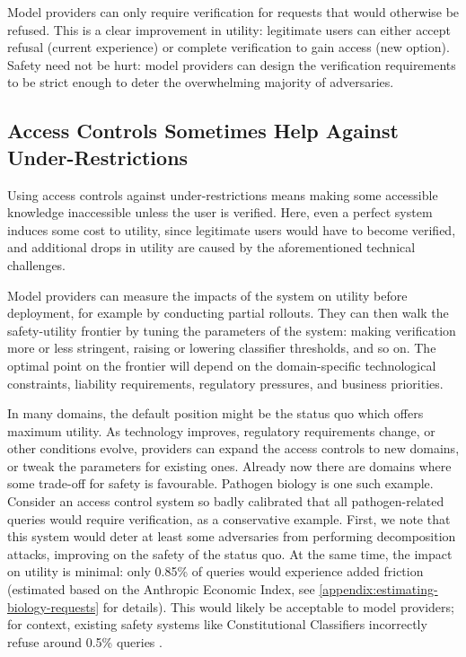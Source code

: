\documentclass{article}
\theoremstyle{plain}
\theoremstyle{definition}
\theoremstyle{remark}
\begin{document}
Model providers can only require verification for requests that would otherwise be refused.
This is a clear improvement in utility: legitimate users can either accept refusal (current experience) or complete verification to gain access (new option).
Safety need not be hurt: model providers can design the verification requirements to be strict enough to deter the overwhelming majority of adversaries.

\subsection{Access Controls Sometimes Help Against Under-Restrictions}
\label{section:under-restriction}

Using access controls against under-restrictions means making some accessible knowledge inaccessible unless the user is verified.
Here, even a perfect system induces some cost to utility, since legitimate users would have to become verified, and additional drops in utility are caused by the aforementioned technical challenges.

Model providers can measure the impacts of the system on utility before deployment, for example by conducting partial rollouts.
They can then walk the safety-utility frontier by tuning the parameters of the system: making verification more or less stringent, raising or lowering classifier thresholds, and so on.
The optimal point on the frontier will depend on the domain-specific technological constraints, liability requirements, regulatory pressures, and business priorities.

In many domains, the default position might be the status quo which offers maximum utility.
As technology improves, regulatory requirements change, or other conditions evolve, providers can expand the access controls to new domains, or tweak the parameters for existing ones.
Already now there are domains where some trade-off for safety is favourable.
Pathogen biology is one such example.
Consider an access control system so badly calibrated that all pathogen-related queries would require verification, as a conservative example.
First, we note that this system would deter at least some adversaries from performing decomposition attacks, improving on the safety of the status quo.
At the same time, the impact on utility is minimal: only 0.85\% of queries would experience added friction (estimated based on the Anthropic Economic Index, see \cref{appendix:estimating-biology-requests} for details).
This would likely be acceptable to model providers; for context, existing safety systems like Constitutional Classifiers incorrectly refuse around 0.5\% queries \cite{sharma2025constitutionalclassifiersdefendinguniversal}.
\end{document}
